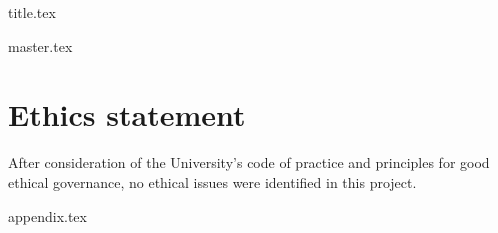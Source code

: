 \documentclass[a4paper, 12pt]{report}
\begin{document}
{title.tex}



\setcounter{tocdepth}{4}



\tableofcontents

\newpage

\listoffigures

\newpage

\listoftables


% 

\printglossary[type=acronym]











{master.tex}






\chapter{Ethics statement}

After consideration of the University's code of practice and principles for good ethical governance, no ethical issues were identified in this project. 


{appendix.tex}





\end{document}
